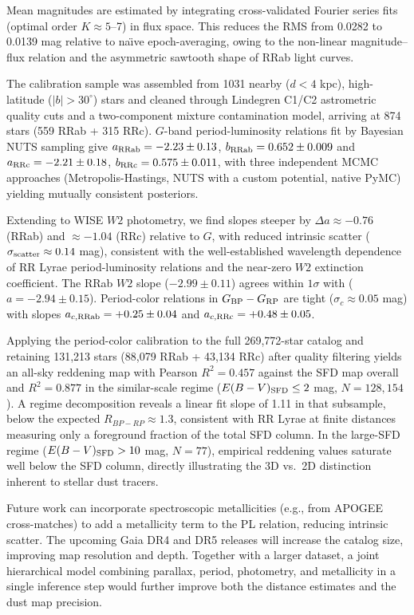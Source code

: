 \documentclass[10pt,preprint2]{aastex}
\begin{document}
Mean magnitudes are estimated by integrating cross-validated Fourier series fits (optimal order $K \approx 5$--7) in flux space. This reduces the RMS from 0.0282 to 0.0139 mag relative to na\"{\i}ve epoch-averaging, owing to the non-linear magnitude--flux relation and the asymmetric sawtooth shape of RRab light curves.

The calibration sample was assembled from 1031 nearby ($d < 4$ kpc), high-latitude ($|b| > 30^\circ$) stars and cleaned through Lindegren C1/C2 astrometric quality cuts and a two-component mixture contamination model, arriving at 874 stars (559 RRab + 315 RRc). $G$-band period-luminosity relations fit by Bayesian NUTS sampling give $a_{\rm RRab} = -2.23\pm0.13$, $b_{\rm RRab} = 0.652\pm0.009$ and $a_{\rm RRc} = -2.21\pm0.18$, $b_{\rm RRc} = 0.575\pm0.011$, with three independent MCMC approaches (Metropolis-Hastings, NUTS with a custom potential, native PyMC) yielding mutually consistent posteriors.

Extending to WISE $W2$ photometry, we find slopes steeper by $\Delta a \approx -0.76$ (RRab) and $\approx -1.04$ (RRc) relative to $G$, with reduced intrinsic scatter ($\sigma_{\rm scatter} \approx 0.14$ mag), consistent with the well-established wavelength dependence of RR Lyrae period-luminosity relations and the near-zero $W2$ extinction coefficient. The RRab $W2$ slope ($-2.99\pm0.11$) agrees within $1\sigma$ with \citet{Dambis2014} ($a = -2.94\pm0.15$). Period-color relations in $G_{\rm BP}-G_{\rm RP}$ are tight ($\sigma_c \approx 0.05$ mag) with slopes $a_{c,\rm RRab} = +0.25\pm0.04$ and $a_{c,\rm RRc} = +0.48\pm0.05$.

Applying the period-color calibration to the full 269,772-star catalog and retaining 131,213 stars (88,079 RRab + 43,134 RRc) after quality filtering yields an all-sky reddening map with Pearson $R^2 = 0.457$ against the SFD map overall and $R^2 = 0.877$ in the similar-scale regime ($E(B-V)_{\rm SFD} \leq 2$ mag, $N = 128{,}154$). A regime decomposition reveals a linear fit slope of 1.11 in that subsample, below the expected $R_{BP-RP} \approx 1.3$, consistent with RR Lyrae at finite distances measuring only a foreground fraction of the total SFD column. In the large-SFD regime ($E(B-V)_{\rm SFD} > 10$ mag, $N = 77$), empirical reddening values saturate well below the SFD column, directly illustrating the 3D vs.\ 2D distinction inherent to stellar dust tracers.

Future work can incorporate spectroscopic metallicities (e.g., from APOGEE cross-matches) to add a metallicity term to the PL relation, reducing intrinsic scatter. The upcoming Gaia DR4 and DR5 releases will increase the catalog size, improving map resolution and depth. Together with a larger dataset, a joint hierarchical model combining parallax, period, photometry, and metallicity in a single inference step would further improve both the distance estimates and the dust map precision.
\end{document}
